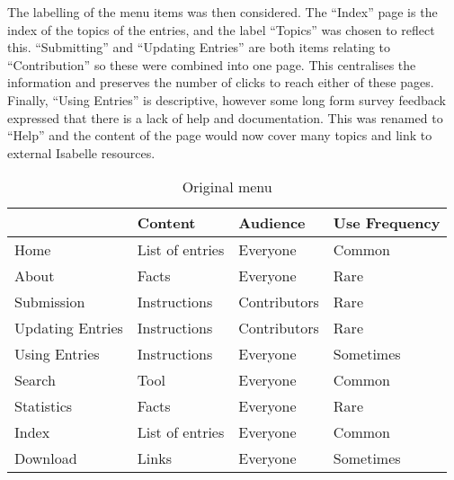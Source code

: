 \documentclass[bsc,frontabs,oneside,singlespacing,parskip,deptreport,logo]{infthesis}
\begin{document}
The labelling of the menu items was then considered. The ``Index'' page is the index of the topics of the entries, and the label ``Topics'' was chosen to reflect this. ``Submitting'' and ``Updating Entries'' are both items relating to ``Contribution'' so these were combined into one page. This centralises the information and preserves the number of clicks to reach either of these pages. Finally, ``Using Entries'' is descriptive, however some long form survey feedback expressed that there is a lack of help and documentation. This was renamed to ``Help'' and the content of the page would now cover many topics and link to external Isabelle resources.

\begin{table}[h]
\centering
\footnotesize
\begin{tabular}{|l|l|l|l|}
\hline
 & \textbf{Content} & \textbf{Audience} & \textbf{Use Frequency} \\ \hline
Home                   & List of entries  & Everyone          & Common                 \\ \hline
About                  & Facts            & Everyone          & Rare                   \\ \hline
Submission             & Instructions     & Contributors      & Rare                   \\ \hline
Updating Entries       & Instructions     & Contributors      & Rare                   \\ \hline
Using Entries          & Instructions     & Everyone          & Sometimes              \\ \hline
Search                 & Tool             & Everyone          & Common                 \\ \hline
Statistics             & Facts            & Everyone          & Rare                   \\ \hline
Index                  & List of entries  & Everyone          & Common                 \\ \hline
Download               & Links            & Everyone          & Sometimes              \\ \hline
\end{tabular}
\caption{Original menu}
\label{originalMenuOrder}
\end{table}
\end{document}
